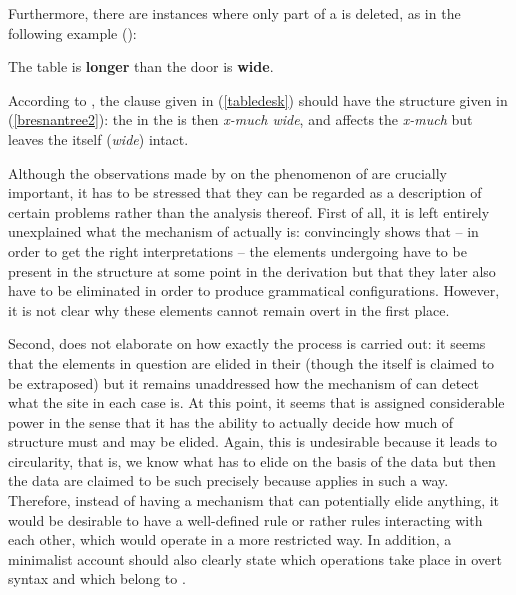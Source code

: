 Furthermore, there are instances where only part of a   is deleted, as in the following example (\citealt[322, ex. 262]{bresnan1973}):

\ea The table is \textbf{longer} than the door is \textbf{wide}. \label{tabledesk}
\z

According to \citet[322--324]{bresnan1973}, the clause given in (\ref{tabledesk}) should have the structure given in (\ref{bresnantree2}): the   in the  is then \textit{x-much wide}, and  affects the   \textit{x-much} but leaves the  itself (\textit{wide}) intact.

Although the observations made by \citet{bresnan1973} on the phenomenon of  are crucially important, it has to be stressed that they can be regarded as a description of certain problems rather than the analysis thereof. First of all, it is left entirely unexplained what the mechanism of  actually is: \citet{bresnan1973} convincingly shows that -- in order to get the right interpretations -- the elements undergoing  have to be present in the structure at some point in the derivation but that they later also have to be eliminated in order to produce grammatical configurations. However, it is not clear why these elements cannot remain overt in the first place.

Second, \citet{bresnan1973} does not elaborate on how exactly the  process is carried out: it seems that the elements in question are elided in their  (though the  itself is claimed to be extraposed) but it remains unaddressed how the mechanism of  can detect what the  site in each case is. At this point, it seems that  is assigned considerable power in the sense that it has the ability to actually decide how much of structure must and may be elided. Again, this is undesirable because it leads to circularity, that is, we know what  has to elide on the basis of the data but then the data are claimed to be such precisely because  applies in such a way. Therefore, instead of having a mechanism that can potentially elide anything, it would be desirable to have a well-defined rule or rather rules interacting with each other, which would operate in a more restricted way. In addition, a minimalist account should also clearly state which operations take place in overt syntax and which belong to .

